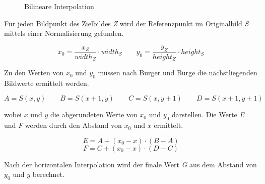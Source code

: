\begin{figure}[htbp]
  \vspace{0.5cm}
  \centering
   \caption{Bilineare Interpolation \cite[S.388]{burger:bv}}
  \label{bilinear_interpolation}
  \vspace{0.5cm}
\end{figure}

Für jeden Bildpunkt des Zielbildes \textit{Z} wird der Referenzpunkt im Originalbild \textit{S} mittels einer Normalisierung gefunden.

\begin{equation}
 x_{0} = \frac{x_{Z}}{width_{Z}}\cdot width_{S}\qquad
 y_{0} = \frac{y_{Z}}{height_{Z}}\cdot height_{S}
\end{equation}

Zu den Werten von $x_{0}$ und $y_{0}$ müssen nach Burger und Burge\cite[S. 387 ff]{burger:bv} die nächstliegenden Bildwerte ermittelt werden.

\begin{equation}
A= S(x,y) \qquad B=S(x+1,y) \qquad C=S(x,y+1)\qquad D=S(x+1,y+1)
\end{equation}

wobei $x$ und $y$ die abgerundeten Werte von $x_{0}$ und $y_{0}$ darstellen. Die Werte \textit{E} und \textit{F} werden durch den Abstand von $x_{0}$ und $x$ ermittelt.

\begin{equation}
E = A + (x_0 - x) \cdot (B - A)
\end{equation}
\begin{equation}
F = C + (x_0 - x) \cdot (D-C)
\end{equation}

\pagebreak

Nach der horizontalen Interpolation wird der finale Wert \textit{G} aus dem Abstand von $y_0$ und $y$ berechnet.

